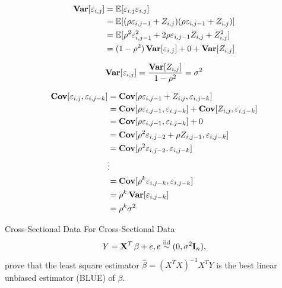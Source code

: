 \documentclass[UTF8,a4paper,10pt]{article}
\begin{document}
  \begin{solution}

    \begin{equation*}
      \begin{aligned}
        \operatorname{\textbf{Var}}[\varepsilon_{i,j}] &= \operatorname{\mathbb{E}}[\varepsilon_{i,j}\varepsilon_{i,j} ]\\
        &= \operatorname{\mathbb{E}}[(\rho \varepsilon_{i,j-1}+Z_{i,j})(\rho \varepsilon_{i,j-1}+Z_{i,j})]\\
        &=\operatorname{\mathbb{E}}[\rho^2 \varepsilon_{i,j-1}^2 + 2\rho \varepsilon_{i,j-1}Z_{i,j} + Z_{i,j}^2]\\
        &=(1-\rho^2)\operatorname{\textbf{Var}}[\varepsilon_{i,j}] + 0 + \operatorname{\textbf{Var}}[Z_{i,j}]
      \end{aligned}
    \end{equation*}    
    
    \begin{equation*}
      \begin{aligned}
        \operatorname{\textbf{Var}}[\varepsilon_{i,j}] = \frac{\operatorname{\textbf{Var}}[Z_{i,j}]}{1-\rho^2} = \sigma^2
      \end{aligned}
    \end{equation*}

    \begin{equation*}
      \begin{aligned}
        \operatorname{\textbf{Cov}}[\varepsilon_{i,j},\varepsilon_{i,j-k}] &= \operatorname{\textbf{Cov}}[\rho \varepsilon_{i,j-1}+Z_{i,j},\varepsilon_{i,j-k}]\\
        & =\operatorname{\textbf{Cov}}[\rho \varepsilon_{i,j-1},\varepsilon_{i,j-k}]+\operatorname{\textbf{Cov}}[Z_{i,j},\varepsilon_{i,j-k}]\\
        & =\operatorname{\textbf{Cov}}[\rho \varepsilon_{i,j-1},\varepsilon_{i,j-k}] + 0\\
        & =\operatorname{\textbf{Cov}}[\rho^2 \varepsilon_{i,j-2} +\rho Z_{i,j-1},\varepsilon_{i,j-k}]\\
        & =\operatorname{\textbf{Cov}}[\rho^2 \varepsilon_{i,j-2},\varepsilon_{i,j-k}]\\
        &\vdots\\
        &=\operatorname{\textbf{Cov}}[\rho^k \varepsilon_{i,j-k},\varepsilon_{i,j-k}]\\
        &=\rho^k\operatorname{\textbf{Var}}[\varepsilon_{i,j-k}]\\
        &=\rho^k\sigma^2
      \end{aligned}
    \end{equation*}


  \end{solution}

  \begin{Problem}[]{Cross-Sectional Data}
    For Cross-Sectional Data
    \begin{equation*}
      \begin{aligned}
        Y = \operatorname{\mathbf{X}}^T\beta + e, e \overset{\text{iid}}{\sim } (0,\sigma^2\mathbf{I}_n),
      \end{aligned}
    \end{equation*}
    prove that the least square estimator \(\hat{\beta} = (X^TX)^{-1}X^TY\) is the best linear unbiased estimator (BLUE) of \(\beta\).
    
      \end{Problem} 
\end{document}
